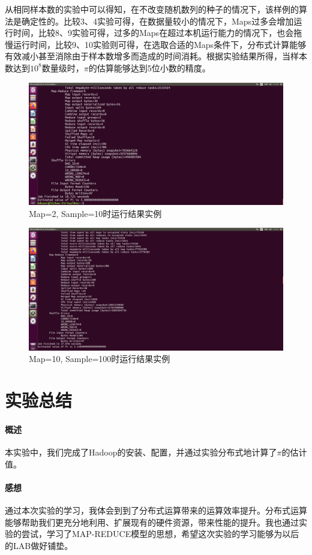 \documentclass{article}
\begin{document}
从相同样本数的实验中可以得知，在不改变随机数列的种子的情况下，该样例的算法是确定性的。比较3、4实验可得，在数据量较小的情况下，Maps过多会增加运行时间，比较8、9实验可得，过多的Maps在超过本机运行能力的情况下，也会拖慢运行时间，比较9、10实验则可得，在选取合适的Maps条件下，分布式计算能够有效减小甚至消除由于样本数增多而造成的时间消耗。根据实验结果所得，当样本数达到$10^8$数量级时，$\pi$的估算能够达到5位小数的精度。


\begin{figure}[htbp]
\centering
\includegraphics[width=13.5cm]{img/2-10.png}
\caption{Map=2, Sample=10时运行结果实例}
\label{fig:2-10}
\end{figure}

\begin{figure}[htbp]
\centering
\includegraphics[width=13.5cm]{img/10-100.png}
\caption{Map=10, Sample=100时运行结果实例}
\label{fig:2-10}
\end{figure}



\section{实验总结}
\paragraph{概述}
本实验中，我们完成了Hadoop的安装、配置，并通过实验分布式地计算了$\pi$的估计值。

\paragraph{感想}
通过本次实验的学习，我体会到到了分布式运算带来的运算效率提升。分布式运算能够帮助我们更充分地利用、扩展现有的硬件资源，带来性能的提升。我也通过实验的尝试，学习了MAP-REDUCE模型的思想，希望这次实验的学习能够为以后的LAB做好铺垫。
\end{document}
